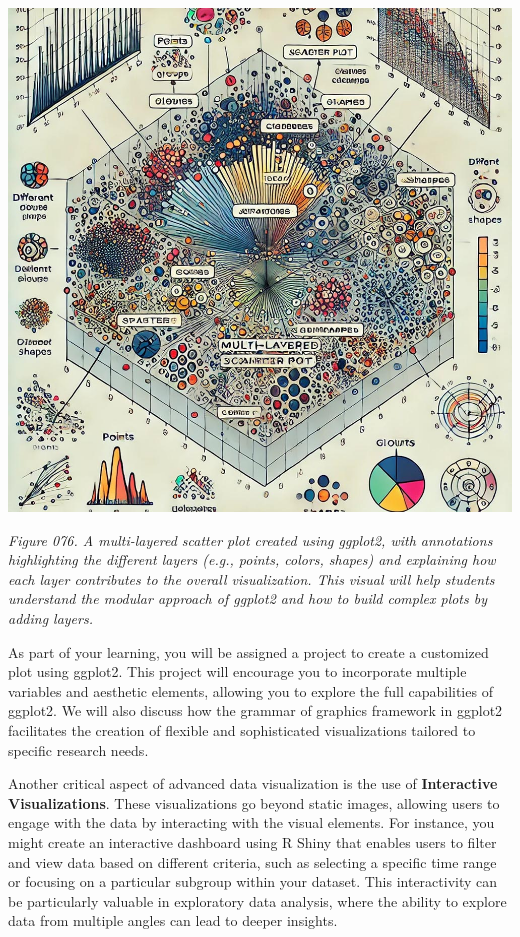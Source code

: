 \documentclass[
]{book}
\begin{document}
\includegraphics[width=1\textwidth,height=\textheight]{images/fig076.jpg}

\emph{Figure 076. A multi-layered scatter plot created using ggplot2, with annotations highlighting the different layers (e.g., points, colors, shapes) and explaining how each layer contributes to the overall visualization. This visual will help students understand the modular approach of ggplot2 and how to build complex plots by adding layers.}

As part of your learning, you will be assigned a project to create a customized plot using ggplot2. This project will encourage you to incorporate multiple variables and aesthetic elements, allowing you to explore the full capabilities of ggplot2. We will also discuss how the grammar of graphics framework in ggplot2 facilitates the creation of flexible and sophisticated visualizations tailored to specific research needs.

Another critical aspect of advanced data visualization is the use of \textbf{Interactive Visualizations}. These visualizations go beyond static images, allowing users to engage with the data by interacting with the visual elements. For instance, you might create an interactive dashboard using R Shiny that enables users to filter and view data based on different criteria, such as selecting a specific time range or focusing on a particular subgroup within your dataset. This interactivity can be particularly valuable in exploratory data analysis, where the ability to explore data from multiple angles can lead to deeper insights.
\end{document}

